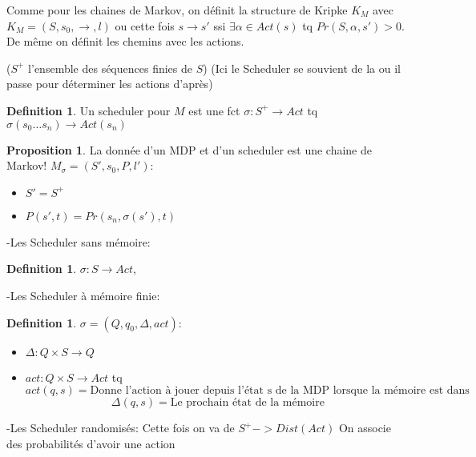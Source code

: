 \documentclass[12pt]{article}
\theoremstyle{plain}
\theoremstyle{definition}
\newtheorem{defn}[subsubsection]{Definition}
\newtheorem{prop}[subsubsection]{Proposition}
\theoremstyle{remark}
\begin{document}
Comme pour les chaines de Markov, on définit la
structure de Kripke $K_M$ avec $K_M=(S,s_0,\to, l)$ 
ou cette fois $s\to s'$ ssi $\exists \alpha\in Act(s)$
tq $Pr(S,\alpha, s')>0$. De même on définit les chemins 
avec les actions.


($S^+$ l'ensemble des séquences finies de $S$)
(Ici le Scheduler se souvient de la ou il passe pour déterminer 
les actions d'après)
\begin{defn}
    Un scheduler pour $M$ est une fct $\sigma:S^+\to Act$
    tq $\sigma(s_0\ldots s_n)\to Act(s_n)$
\end{defn}

\begin{prop}
    La donnée d'un MDP et d'un scheduler est une chaine de 
    Markov! $M_{\sigma}=(S', s_0, P, l')$:
    \begin{itemize}
        \item $S'=S^+$
        \item $P(s', t)=Pr(s_n,\sigma(s'), t)$
    \end{itemize}
\end{prop}

-Les Scheduler sans mémoire: 
\begin{defn}
    $\sigma:S\to Act$, 
\end{defn}

-Les Scheduler à mémoire finie:
\begin{defn}
    $\sigma=(Q, q_0, \Delta, act):$
    \begin{itemize}
        \item $\Delta: Q\times S\to Q$
        \item $act:Q\times S\to Act$ tq 
        \[act(q,s)=\text{Donne l'action à jouer depuis l'état s
        de la MDP lorsque la  mémoire est dans le mode q}\]
        \[\Delta(q,s)=\text{Le prochain état de la mémoire}\]
    \end{itemize}
\end{defn}

-Les Scheduler randomisés: Cette fois on va de $S^+->Dist(Act)$
On associe des probabilités d'avoir une action
\end{document}
